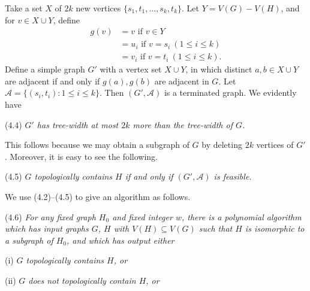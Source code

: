 Take a set $X$ of $2k$ new vertices $\{s_1, t_1, \dots, s_k, t_k\}$. Let $Y = V(G) - V(H)$, and for $v \in X \cup Y$, define
\begin{align*}
g(v) &= v \text{ if } v \in Y \\
&= u_i \text{ if } v = s_i \ (1 \le i \le k) \\
&= v_i \text{ if } v = t_i \ (1 \le i \le k).
\end{align*}
Define a simple graph $G'$ with a vertex set $X \cup Y$, in which distinct $a, b \in X \cup Y$ are adjacent if and only if $g(a), g(b)$ are adjacent in $G$. Let $\mathscr{A} = \{(s_i, t_i) : 1 \le i \le k\}$. Then $(G', \mathscr{A})$ is a terminated graph. We evidently have

\stmt
(4.4) \textit{$G'$ has tree-width at most $2k$ more than the tree-width of $G$.}

This follows because we may obtain a subgraph of $G$ by deleting $2k$ vertices of $G'$. Moreover, it is easy to see the following.

\stmt
(4.5) \textit{ $G$ topologically contains $H$ if and only if $(G', \mathscr{A})$ is feasible.}

We use (4.2)--(4.5) to give an algorithm as follows.

\stmt
(4.6) \textit{For any fixed graph $H_0$ and fixed integer $w$, there is a polynomial algorithm which has input graphs $G$, $H$ with $V(H) \subseteq V(G)$ such that $H$ is isomorphic to a subgraph of $H_0$, and which has output either}

\hspace*{12pt}(i) \textit{$G$ topologically contains $H$, or}

\hspace*{12pt}(ii) \textit{$G$ does not topologically contain $H$, or}

